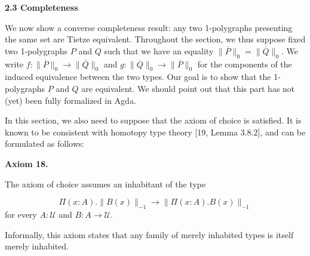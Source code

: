  
 
 
 
 
\par\medskip\noindent\textbf{2.3 Completeness}\par
 
 
We now show a converse completeness result: any two 1-polygraphs presenting the same set are Tietze equivalent. Throughout the section, we thus suppose fixed two 1-polygraphs $P$ and $Q$ such that we have an equality $\|\overline{P}\|_{0}=\|\overline{Q}\|_{0}$. We write $f:\|\overline{P}\|_{0}\to\|\overline{Q}\|_{0}$ and $g:\|\overline{Q}\|_{0}\to\|\overline{P}\|_{0}$ for the components of the induced equivalence between the two types. Our goal is to show that the 1-polygraphs $P$ and $Q$ are equivalent. We should point out that this part has not (yet) been fully formalized in Agda.\par
 
 
 
In this section, we also need to suppose that the axiom of choice is satisfied. It is known to be consistent with homotopy type theory [19, Lemma 3.8.2], and can be formulated as follows:\par
 
 
 
\par\medskip\noindent\textbf{Axiom 18.}\par
 
 
The axiom of choice assumes an inhabitant of the type\par
    \[\Pi(x:A).\|B(x)\|_{-1}\to\|\Pi(x:A).B(x)\|_{-1}\]    
for every $A:\mathcal{U}$ and $B:A\to\mathcal{U}$.\par
 
 
 
 
Informally, this axiom states that any family of merely inhabited types is itself merely inhabited.\par
 
